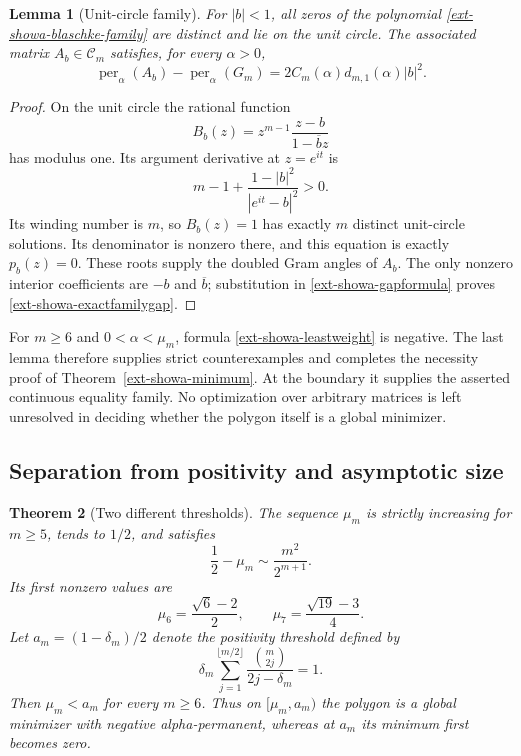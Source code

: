 \documentclass[11pt,a4paper]{article}
\newtheorem{theorem}{Theorem}[section]
\newtheorem{lemma}[theorem]{Lemma}
\theoremstyle{definition}\newtheorem{definition}[theorem]{Definition}
\theoremstyle{remark}\newtheorem{remark}[theorem]{Remark}
\numberwithin{equation}{section}
\begin{document}
\begin{lemma}[Unit-circle family]
\label{ext-showa-blaschke}
For $|b|<1$, all zeros of the polynomial
\eqref{ext-showa-blaschke-family} are distinct and lie on the unit circle.
The associated matrix $A_b\in\mathcal C_m$ satisfies, for every $\alpha>0$,
\begin{equation}\label{ext-showa-exactfamilygap}
 \operatorname{per}_{\alpha}(A_b)-\operatorname{per}_{\alpha}(G_m)
       =2C_m(\alpha)d_{m,1}(\alpha)|b|^2.
\end{equation}
\end{lemma}
\begin{proof}
On the unit circle the rational function
\[
 B_b(z)=z^{m-1}\frac{z-b}{1-\overline b z}
\]
has modulus one. Its argument derivative at $z=e^{it}$ is
\[
 m-1+\frac{1-|b|^2}{|e^{it}-b|^2}>0.
\]
Its winding number is $m$, so $B_b(z)=1$ has exactly $m$ distinct
unit-circle solutions. Its denominator is nonzero there, and this
equation is exactly $p_b(z)=0$. These roots supply the doubled Gram
angles of $A_b$. The only nonzero interior coefficients are $-b$ and
$\overline b$; substitution in \eqref{ext-showa-gapformula} proves
\eqref{ext-showa-exactfamilygap}.
\end{proof}

For $m\ge6$ and $0<\alpha<\mu_m$, formula
\eqref{ext-showa-leastweight} is negative. The last lemma therefore
supplies strict counterexamples and completes the necessity proof of
Theorem~\ref{ext-showa-minimum}. At the boundary it supplies the asserted
continuous equality family. No optimization over arbitrary matrices is
left unresolved in deciding whether the polygon itself is a global
minimizer.

\subsection{Separation from positivity and asymptotic size}

\begin{theorem}[Two different thresholds]
\label{ext-showa-asymptotic}
The sequence $\mu_m$ is strictly increasing for $m\ge5$, tends to
$1/2$, and satisfies
\begin{equation}\label{ext-showa-muasym}
 \frac12-\mu_m\sim\frac{m^2}{2^{m+1}}.
\end{equation}
Its first nonzero values are
\[
 \mu_6=\frac{\sqrt6-2}{2},\qquad
 \mu_7=\frac{\sqrt{19}-3}{4}.
\]
Let $a_m=(1-\delta_m)/2$ denote the positivity threshold defined by
\[
 \delta_m\sum_{j=1}^{\lfloor m/2\rfloor}
       \frac{\binom m{2j}}{2j-\delta_m}=1.
\]
Then $\mu_m<a_m$ for every $m\ge6$. Thus on
$[\mu_m,a_m)$ the polygon is a global minimizer with negative
alpha-permanent, whereas at $a_m$ its minimum first becomes zero.
\end{theorem}
\end{document}
